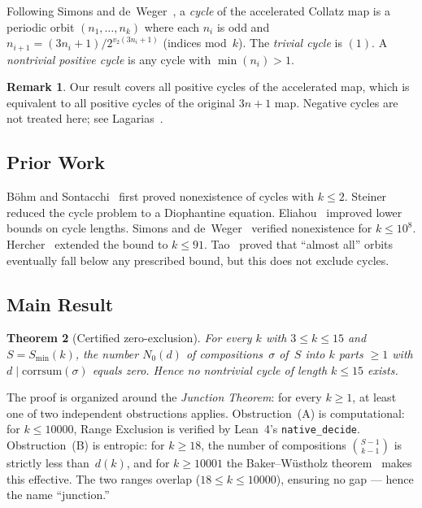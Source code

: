 \documentclass[11pt,a4paper]{article}
\theoremstyle{plain}
\newtheorem{theorem}{Theorem}[section]
\theoremstyle{definition}
\newtheorem{remark}[theorem]{Remark}
\newcommand{\corr}{\mathrm{corrsum}}
\begin{document}
Following Simons and de~Weger~\cite{SdW05}, a \emph{cycle} of the accelerated Collatz map is a periodic orbit $(n_1, \ldots, n_k)$ where each $n_i$ is odd and $n_{i+1} = (3n_i+1)/2^{v_2(3n_i+1)}$ (indices mod~$k$). The \emph{trivial cycle} is $(1)$. A \emph{nontrivial positive cycle} is any cycle with $\min(n_i) > 1$.

\begin{remark}
Our result covers all positive cycles of the accelerated map, which is equivalent to all positive cycles of the original $3n+1$ map. Negative cycles are not treated here; see Lagarias~\cite{Lagarias85}.
\end{remark}

\subsection{Prior Work}

B\"ohm and Sontacchi~\cite{BS78} first proved nonexistence of cycles with $k \leq 2$. Steiner~\cite{Steiner77} reduced the cycle problem to a Diophantine equation. Eliahou~\cite{Eliahou93} improved lower bounds on cycle lengths. Simons and de~Weger~\cite{SdW05} verified nonexistence for $k \leq 10^8$. Hercher~\cite{Hercher25} extended the bound to $k \leq 91$. Tao~\cite{Tao22} proved that ``almost all'' orbits eventually fall below any prescribed bound, but this does not exclude cycles.

\subsection{Main Result}

\begin{theorem}[Certified zero-exclusion]\label{thm:main}
For every $k$ with $3 \leq k \leq 15$ and $S = S_{\min}(k)$, the number $N_0(d)$ of compositions~$\sigma$ of~$S$ into $k$ parts $\geq 1$ with $d \mid \corr(\sigma)$ equals zero. Hence no nontrivial cycle of length $k \leq 15$ exists.
\end{theorem}

The proof is organized around the \emph{Junction Theorem}: for every $k \geq 1$, at least one of two independent obstructions applies. Obstruction~(A) is computational: for $k \leq 10000$, Range Exclusion is verified by Lean~4's \texttt{native\_decide}. Obstruction~(B) is entropic: for $k \geq 18$, the number of compositions $\binom{S-1}{k-1}$ is strictly less than~$d(k)$, and for $k \geq 10001$ the Baker--W\"ustholz theorem~\cite{BW93} makes this effective. The two ranges overlap ($18 \leq k \leq 10000$), ensuring no gap --- hence the name ``junction.''
\end{document}
